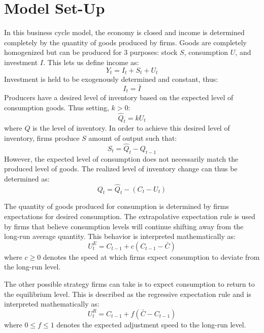 \section{Model Set-Up}
In this business cycle model, the economy is closed and income is determined completely by the quantity of goods produced by firms. Goods are completely homogenized but can be produced for 3 purposes: stock $S$, consumption $U$, and investment $I$. This lets us define income as:
\begin{equation}
    Y_t=I_t+S_t+U_t
\end{equation}
Investment is held to be exogenously determined and constant, thus:
\begin{equation}
    I_t=\bar I
\end{equation}
Producers have a desired level of inventory based on the expected level of consumption goods. Thus setting, $k>0$:
\begin{equation}
    \hat Q_t=kU_t
\end{equation}  
where $Q$ is the level of inventory. In order to achieve this desired level of inventory, firms produce $S$ amount of output such that:
\begin{equation}
    S_t=\hat Q_t-Q_{t-1}
\end{equation}
However, the expected level of consumption does not necessarily match the produced level of goods. The realized level of inventory change can thus be determined as:
\begin{equation}
    Q_t=\hat Q_t-(C_t-U_t)
\end{equation}

The quantity of goods produced for consumption is determined by firms expectations for desired consumption. The extrapolative expectation rule is used by firms that believe consumption levels will continue shifting away from the long-run average quantity. This behavior is interpreted mathematically as:
\begin{equation}
    U^E_t=C_{t-1}+c(C_{t-1}-\bar C)
\end{equation}
where $c\geq 0$ denotes the speed at which firms expect consumption to deviate from the long-run level. 

The other possible strategy firms can take is to expect consumption to return to the equilibrium level. This is described as the regressive expectation rule and is interpreted mathematically as:
\begin{equation}
    U_t^R=C_{t-1}+f(\bar C-C_{t-1})
\end{equation}
where $0\leq f\leq 1$ denotes the expected adjustment speed to the long-run level. 

